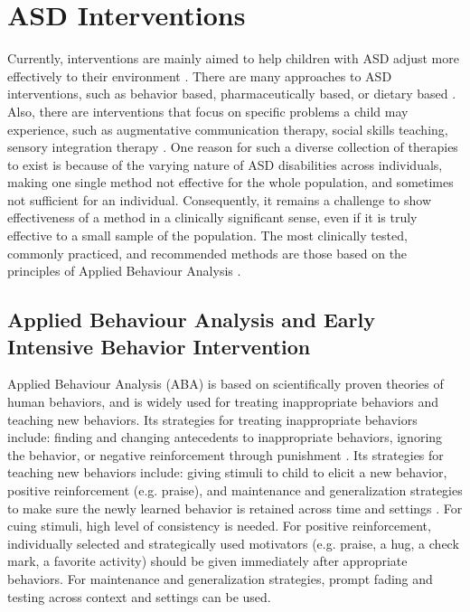 \section{ASD Interventions}

Currently, interventions are mainly aimed to help children with ASD adjust more effectively to their environment \cite{francis2005autism}.  There are many approaches to ASD interventions, such as behavior based, pharmaceutically based, or dietary based \cite{francis2005autism}.  Also, there are interventions that focus on specific problems a child may experience, such as augmentative communication therapy, social skills teaching, sensory integration therapy \cite{francis2005autism}.  One reason for such a diverse collection of therapies to exist is because of the varying nature of ASD disabilities across individuals, making one single method not effective for the whole population, and sometimes not sufficient for an individual.  Consequently, it remains a challenge to show effectiveness of a method in a clinically significant sense, even if it is truly effective to a small sample of the population.  The most clinically tested, commonly practiced, and recommended methods are those based on the principles of Applied Behaviour Analysis \cite{foxx2008applied}.


\subsection{Applied Behaviour Analysis and Early Intensive Behavior Intervention}
Applied Behaviour Analysis (ABA) is based on scientifically proven theories of human behaviors, and is widely used for treating inappropriate behaviors and teaching new behaviors.  Its strategies for treating inappropriate behaviors include: finding and changing antecedents to inappropriate behaviors, ignoring the behavior, or negative reinforcement through punishment \cite{foxx1982decreasing}.  Its strategies for teaching new behaviors include: giving stimuli to child to elicit a new behavior, positive reinforcement (e.g. praise), and maintenance and generalization strategies to make sure the newly learned behavior is retained across time and settings \cite{foxx1982decreasing}.  For cuing stimuli, high level of consistency is needed.  For positive reinforcement, individually selected and strategically used motivators (e.g. praise, a hug, a check mark, a favorite activity) should be given immediately after appropriate behaviors.  For maintenance and generalization strategies, prompt fading and testing across context and settings can be used.


